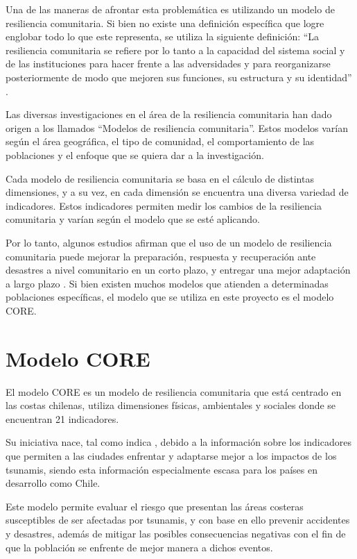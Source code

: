 \documentclass[12pt,letterpaper,oneside]{report}
\begin{document}
Una de las maneras de afrontar esta problem\'atica es utilizando un modelo de resiliencia comunitaria. Si bien no existe una definici\'on espec\'ifica que logre englobar todo lo que este representa, se utiliza la siguiente definici\'on: ``La resiliencia comunitaria se refiere por lo tanto a la capacidad del sistema social y de las instituciones para hacer frente a las adversidades y para reorganizarse posteriormente de modo que mejoren sus funciones, su estructura y su identidad'' \parencite{maguire2008}.

Las diversas investigaciones en el \'area de la resiliencia comunitaria han dado origen a los llamados ``Modelos de resiliencia comunitaria''. Estos modelos var\'ian seg\'un el \'area geogr\'afica, el tipo de comunidad, el comportamiento de las poblaciones y el enfoque que se quiera dar a la investigaci\'on.

Cada modelo de resiliencia comunitaria se basa en el c\'alculo de distintas dimensiones, y a su vez, en cada dimensi\'on se encuentra una diversa variedad de indicadores. Estos indicadores permiten medir los cambios de la resiliencia comunitaria y var\'ian seg\'un el modelo que se est\'e aplicando.

Por lo tanto, algunos estudios afirman que el uso de un modelo de resiliencia comunitaria puede mejorar la preparaci\'on, respuesta y recuperaci\'on ante desastres a nivel comunitario en un corto plazo, y entregar una mejor adaptaci\'on a largo plazo \parencite{cutter2014}. Si bien existen muchos modelos que atienden a determinadas poblaciones espec\'ificas, el modelo que se utiliza en este proyecto es el modelo CORE.

\section{Modelo CORE}
\label{sec:modelo-core}

El modelo CORE es un modelo de resiliencia comunitaria que est\'a centrado en las costas chilenas, utiliza dimensiones f\'isicas, ambientales y sociales donde se encuentran 21 indicadores.

Su iniciativa nace, tal como indica \textcite{villagra2017}, debido a la informaci\'on sobre los indicadores que permiten a las ciudades enfrentar y adaptarse mejor a los impactos de los tsunamis, siendo esta informaci\'on especialmente escasa para los pa\'ises en desarrollo como Chile.

Este modelo permite evaluar el riesgo que presentan las \'areas costeras susceptibles de ser afectadas por tsunamis, y con base en ello prevenir accidentes y desastres, adem\'as de mitigar las posibles consecuencias negativas con el fin de que la poblaci\'on se enfrente de mejor manera a dichos eventos.
\end{document}

